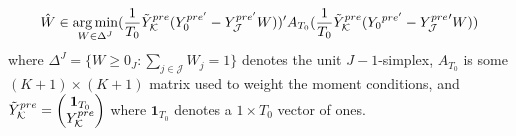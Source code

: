 \documentclass{article}
\DeclareMathOperator*{\argmin}{arg\,min}
\begin{document}
\begin{equation} \label{eq: Time-Series Averaged SC}
    \hat{W} \in \argmin_{W \in \Delta^{J}} (\frac{1}{T_0} \Tilde{Y}_{\mathcal{K}}^{pre}
     (Y_0^{pre'}
     - Y_{\mathcal{J}}^{pre'} W))'A_{T_0}(\frac{1}{T_0} {\Tilde{Y}_{\mathcal{K}}}^{pre} 
     ({Y_{0}}^{pre'} - {Y_{\mathcal{J}}^{pre}}' W))
\end{equation}
where $\Delta^J = \{ W \geq 0_J : \sum_{j \in \mathcal{J}} W_j = 1 \}$ denotes the unit $J-1$-simplex, $A_{T_0}$ is some $(K+1 )\times (K+1)$ matrix used to weight the moment conditions, and $\Tilde{Y}_{\mathcal{K}}^{pre} = \begin{pmatrix}     \textbf{1}_{T_0} \\     Y_{\mathcal{K}}^{pre}     \end{pmatrix}$ where $\textbf{1}_{T_0}$ denotes a $1 \times T_0$ vector of ones.
\end{document}
